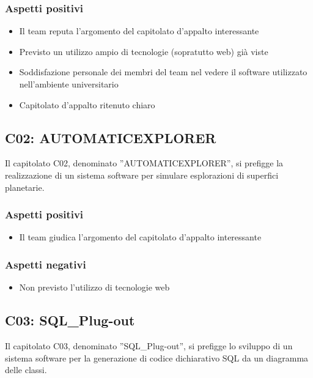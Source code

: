 \documentclass[11pt,a4paper]{article}
\begin{document}
\subsubsection{Aspetti positivi}

\begin{itemize}
 \item Il team reputa l'argomento del capitolato d'appalto interessante
 \item Previsto un utilizzo ampio di tecnologie (sopratutto web) già viste
 \item Soddisfazione personale dei membri del team nel vedere il software utilizzato nell'ambiente universitario
 \item Capitolato d'appalto ritenuto chiaro
\end{itemize}

\subsection{C02: AUTOMATICEXPLORER}
Il capitolato C02, denominato ''AUTOMATICEXPLORER'', si prefigge la realizzazione di un sistema software per simulare esplorazioni di superfici planetarie.

\subsubsection{Aspetti positivi}

\begin{itemize}
 \item Il team giudica l'argomento del capitolato d'appalto interessante
\end{itemize}

\subsubsection{Aspetti negativi}

\begin{itemize}
 \item Non previsto l'utilizzo di tecnologie web
\end{itemize}

\subsection{C03: SQL\_Plug-out}
Il capitolato C03, denominato ''SQL\_Plug-out'', si prefigge lo sviluppo di un sistema software per la generazione di codice dichiarativo SQL da un diagramma delle classi.
\end{document}
